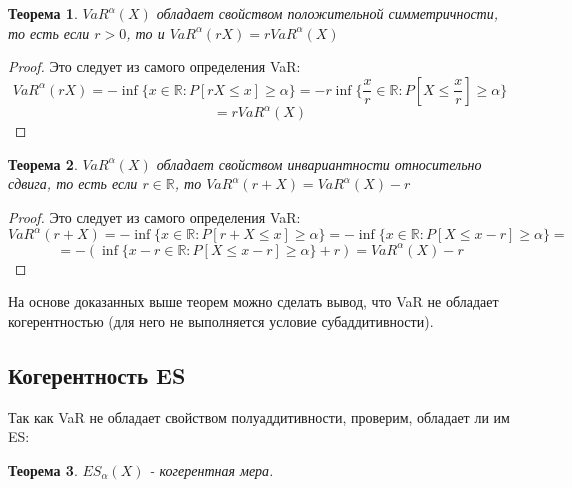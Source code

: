 \documentclass[18pt,a4paper]{article}
\theoremstyle{plain}
\newtheorem{Th}{Теорема}[section]
\theoremstyle{definition}
\begin{document}
\begin{Th} \label{main} $VaR^\alpha(X)$ обладает свойством положительной симметричности, то есть если $ r >0$, то и $ VaR^\alpha(rX) =r VaR^\alpha(X)$
\end{Th}

\begin{proof}
Это следует из самого определения VaR:
$$
VaR^\alpha(rX) = -\inf\{x\in \mathbb{R} : P[rX \le x] \ge \alpha\} =  -r\inf\{\frac{x}{r}\in \mathbb{R} : P[X \le \frac{x}{r}] \ge \alpha\}
$$
$$
 = r VaR^\alpha(X)
$$
\end{proof}

\begin{Th} \label{main} $VaR^\alpha(X)$ обладает свойством инвариантности относительно сдвига, то есть если $r \in \mathbb{R}$, то $VaR^\alpha(r+X) = VaR^\alpha(X) - r$
\end{Th}

\begin{proof}
Это следует из самого определения VaR:
$$
VaR^\alpha(r+X) = -\inf\{x\in \mathbb{R} : P[r+X \le x] \ge \alpha\} = -\inf\{x\in \mathbb{R} : P[X \le x-r] \ge \alpha\} =
$$
$$
 = -(\inf\{x-r\in \mathbb{R} : P[X \le x-r] \ge \alpha\} + r) = VaR^\alpha(X) - r
$$
\end{proof}

На основе доказанных выше теорем можно сделать вывод, что VaR не обладает когерентностью (для него не выполняется условие субаддитивности).

\centering\subsection{Когерентность ES}


\flushleft


Так как VaR не обладает свойством полуаддитивности, проверим, обладает ли им ES:\\

\begin{Th} \label{main} $ES_\alpha(X)$ - когерентная мера.
\end{Th}
\end{document}
